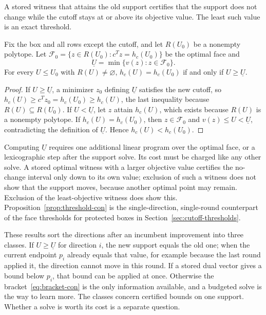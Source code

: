 A stored witness that attains the old support certifies that the support
does not change while the cutoff stays at or above its objective value.
The least such value is an exact threshold.

\begin{proposition}\label{prop:threshold-con}
Fix the box and all rows except the cutoff, and let $R(U_0)$ be a nonempty
polytope. Let $\mathcal F_0=\{z\in R(U_0):c^Tz=h_c(U_0)\}$ be the optimal
face and
\[
 \underline U=\min\{v(z):z\in\mathcal F_0\}.
\]
For every $U\le U_0$ with $R(U)\ne\varnothing$, $h_c(U)=h_c(U_0)$ if and
only if $U\ge\underline U$.
\end{proposition}

\begin{proof}
If $U\ge\underline U$, a minimizer $z_0$ defining $\underline U$
satisfies the new cutoff, so $h_c(U)\ge c^Tz_0=h_c(U_0)\ge h_c(U)$, the
last inequality because $R(U)\subseteq R(U_0)$. If $U<\underline U$, let
$z$ attain $h_c(U)$, which exists because $R(U)$ is a nonempty polytope.
If $h_c(U)=h_c(U_0)$, then $z\in\mathcal F_0$ and
$v(z)\le U<\underline U$, contradicting the definition of $\underline U$.
Hence $h_c(U)<h_c(U_0)$.
\end{proof}

Computing $\underline U$ requires one additional linear program over the
optimal face, or a lexicographic step after the support solve. Its cost
must be charged like any other solve. A stored optimal witness with a
larger objective value certifies the no-change interval only down to its
own value; exclusion of such a witness does not show that the support
moves, because another optimal point may remain. Exclusion of the
least-objective witness does show this.
Proposition~\ref{prop:threshold-con} is the single-direction,
single-round counterpart of the face thresholds for protected boxes in
Section~\ref{sec:cutoff-thresholds}.

These results sort the directions after an incumbent improvement into
three classes. If $U\ge\underline U$ for direction $i$, the new support
equals the old one; when the current endpoint $p_i$ already equals that
value, for example because the last round applied it, the direction cannot
move in this round. If a stored dual vector gives a bound below $p_i$, that
bound can be applied at once. Otherwise the
bracket~\eqref{eq:bracket-con} is the only information available, and a
budgeted solve is the way to learn more. The classes concern certified
bounds on one support. Whether a solve is worth its cost is a separate
question.

